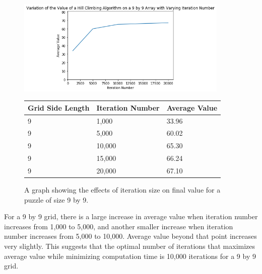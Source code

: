 \documentclass[12pt]{article}
\begin{document}
\begin{figure}[H]
    \centering
    \includegraphics[width=0.9\textwidth]{hill_climbing_9x9_iterations}
\begin{tabular}{ |p{4cm}||p{4cm}|p{4cm}|  }
 \hline
Grid Side Length& Iteration Number &Average Value\\
 \hline
9&1,000&33.96\\
9&5,000&60.02\\
9&10,000&65.30\\
9&15,000&66.24\\
9&20,000&67.10\\
 \hline
\end{tabular}
    \caption{A graph showing the effects of iteration size on final value for a puzzle of size 9 by 9.}
    \label{fig:hill_climbing_9x9_iterations}
\end{figure}

For a 9 by 9 grid, there is a large increase in average value when iteration number increases from 1,000 to 5,000, and another smaller increase when iteration number increases from 5,000 to 10,000. Average value beyond that point increases very slightly. This suggests that the optimal number of iterations that maximizes average value while minimizing computation time is 10,000 iterations for a 9 by 9 grid.
\end{document}
